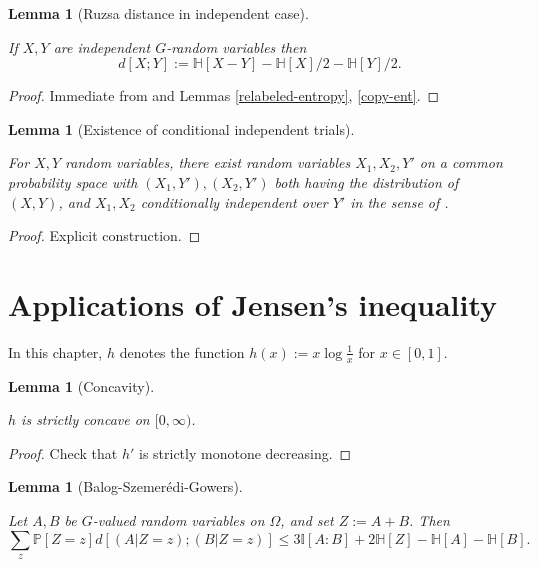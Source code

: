 \documentclass[10pt,a4paper]{article}
\newtheorem{lemma}[theorem]{Lemma}
\newcommand{\lean}[1]{}
\newcommand{\uses}[1]{}
\newcommand{\leanok}{}
\newcommand{\chapter}[1]{\section{#1}}
\newcommand{\bbH}{\mathbb{H}}
\newcommand{\bbP}{\mathbb{P}}
\newcommand{\bbI}{\mathbb{I}}
\begin{document}
\begin{lemma}[Ruzsa distance in independent case]\label{ruz-indep}
  \uses{ruz-dist-def}
  \lean{ProbabilityTheory.IndepFun.rdist_eq}\leanok
  If $X,Y$ are independent $G$-random variables then
  $$ d[X ;Y] := \bbH[X - Y] - \bbH[X]/2 - \bbH[Y]/2.$$
\end{lemma}

\begin{proof} \uses{relabeled-entropy, copy-ent}\leanok Immediate from  and Lemmas \ref{relabeled-entropy}, \ref{copy-ent}.
\end{proof}


\begin{lemma}[Existence of conditional independent trials]\label{cond-indep-exist}
  \uses{conditional-independent-def}
  \lean{ProbabilityTheory.condIndep_copies}\leanok
  For $X,Y$ random variables, there exist random variables $X_1,X_2,Y'$ on a common probability space with $(X_1, Y'), (X_2, Y')$ both having the distribution of $(X,Y)$, and $X_1, X_2$ conditionally independent over $Y'$ in the sense of .
\end{lemma}

\begin{proof}\leanok Explicit construction.
\end{proof}



\chapter{Applications of Jensen's inequality}

In this chapter, $h$ denotes the function $h(x) := x \log \frac{1}{x}$ for $x \in [0,1]$.

\begin{lemma}[Concavity]\label{concave}
  \lean{Real.strictConcaveOn_negMulLog}\leanok
  $h$ is strictly concave on $[0,\infty)$.
\end{lemma}

\begin{proof} \leanok Check that $h'$ is strictly monotone decreasing.
\end{proof}

\begin{lemma}[Balog-Szemer\'edi-Gowers]\label{entropic-bsg}
  \lean{ent_bsg}\leanok
  Let $A,B$ be $G$-valued random variables on $\Omega$, and set $Z := A+B$.
Then
\begin{equation}\label{2-bsg-takeaway} \sum_{z}  \bbP[Z=z] d[(A | Z = z); (B | Z = z)] \leq 3  \bbI[A:B] + 2 \bbH[Z] - \bbH[A] - \bbH[B]. \end{equation}
\end{lemma}
\end{document}
